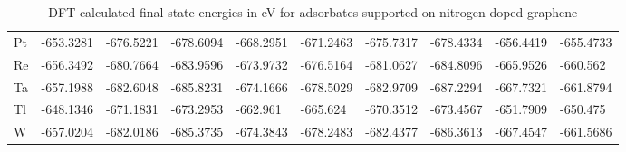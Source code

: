 \begin{table}[h]
{\begin{tabular}{*{10}{l}}
      Pt	& -653.3281	&-676.5221	&-678.6094	&-668.2951	&-671.2463	&-675.7317	&-678.4334	&-656.4419	&-655.4733 \\
      Re	& -656.3492	&-680.7664	&-683.9596	&-673.9732	&-676.5164	&-681.0627	&-684.8096	&-665.9526	&-660.562  \\
      Ta	& -657.1988	&-682.6048	&-685.8231	&-674.1666	&-678.5029	&-682.9709	&-687.2294	&-667.7321	&-661.8794 \\
      Tl	& -648.1346	&-671.1831	&-673.2953	&-662.961	  &-665.624	  &-670.3512	&-673.4567	&-651.7909	&-650.475  \\
      W	  & -657.0204	&-682.0186	&-685.3735	&-674.3843	&-678.2483	&-682.4377	&-686.3613	&-667.4547	&-661.5686 \\
      \hline
    \end{tabular}
    }
    \caption{DFT calculated final state energies in eV for adsorbates supported on nitrogen-doped graphene}
    \label{si_table5}
\end{table}


